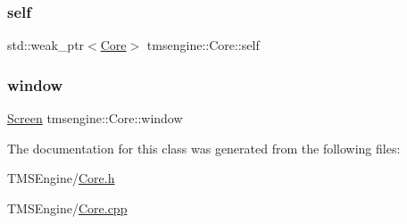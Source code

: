 \mbox{\label{classtmsengine_1_1_core_a8a48e579f54f5ec8c9e795c544c72ecc}} 
\subsubsection{\texorpdfstring{self}{self}}
{\footnotesize\ttfamily std\+::weak\+\_\+ptr$<$\hyperlink{classtmsengine_1_1_core}{Core}$>$ tmsengine\+::\+Core\+::self\hspace{0.3cm}{\ttfamily [private]}}

\mbox{\label{classtmsengine_1_1_core_ac0aa6ed388a9fb1fda4c190fc0bb762b}} 
\subsubsection{\texorpdfstring{window}{window}}
{\footnotesize\ttfamily \hyperlink{classtmsengine_1_1_screen}{Screen} tmsengine\+::\+Core\+::window\hspace{0.3cm}{\ttfamily [private]}}



The documentation for this class was generated from the following files\+:\begin{DoxyCompactItemize}
\item 
T\+M\+S\+Engine/\hyperlink{_core_8h}{Core.\+h}\item 
T\+M\+S\+Engine/\hyperlink{_core_8cpp}{Core.\+cpp}\end{DoxyCompactItemize}
